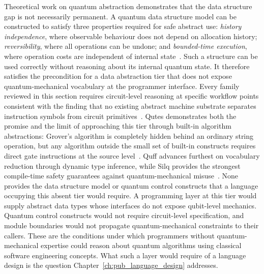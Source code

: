 Theoretical work on quantum abstraction demonstrates that the data structure gap is not necessarily permanent.
A quantum data structure model can be constructed to satisfy three properties required for safe abstract use: \textit{history independence}, where observable behaviour does not depend on allocation history; \textit{reversibility}, where all operations can be undone; and \textit{bounded-time execution}, where operation costs are independent of internal state~\cite{yuan2025foundationalabstractions}.
Such a structure can be used correctly without reasoning about its internal quantum state.
It therefore satisfies the precondition for a data abstraction tier that does not expose quantum-mechanical vocabulary at the programmer interface.
Every family reviewed in this section requires circuit-level reasoning at specific workflow points consistent with the finding that no existing abstract machine substrate separates instruction symbols from circuit primitives~\cite{nunez_corrales2025betterabstractmachines}.
Qutes demonstrates both the promise and the limit of approaching this tier through built-in algorithm abstractions: Grover's algorithm is completely hidden behind an ordinary string operation, but any algorithm outside the small set of built-in constructs requires direct gate instructions at the source level~\cite{faro2025qutes}.
Quff advances furthest on vocabulary reduction through dynamic type inference, while Silq provides the strongest compile-time safety guarantees against quantum-mechanical misuse~\cite{wright2024quff,bichsel2020silq}.
None provides the data structure model or quantum control constructs that a language occupying this absent tier would require.
A programming layer at this tier would supply abstract data types whose interfaces do not expose qubit-level mechanics.
Quantum control constructs would not require circuit-level specification, and module boundaries would not propagate quantum-mechanical constraints to their callers.
These are the conditions under which programmers without quantum-mechanical expertise could reason about quantum algorithms using classical software engineering concepts.
What such a layer would require of a language design is the question Chapter~\ref{ch:pub_language_design} addresses.